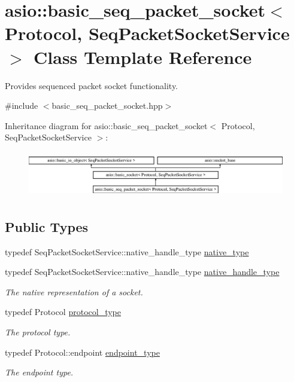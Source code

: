 \hypertarget{classasio_1_1basic__seq__packet__socket}{}\section{asio\+:\+:basic\+\_\+seq\+\_\+packet\+\_\+socket$<$ Protocol, Seq\+Packet\+Socket\+Service $>$ Class Template Reference}
\label{classasio_1_1basic__seq__packet__socket}


Provides sequenced packet socket functionality.  




{\ttfamily \#include $<$basic\+\_\+seq\+\_\+packet\+\_\+socket.\+hpp$>$}

Inheritance diagram for asio\+:\+:basic\+\_\+seq\+\_\+packet\+\_\+socket$<$ Protocol, Seq\+Packet\+Socket\+Service $>$\+:\begin{figure}[H]
\begin{center}
\leavevmode
\includegraphics[height=2.033898cm]{classasio_1_1basic__seq__packet__socket}
\end{center}
\end{figure}
\subsection*{Public Types}
\begin{DoxyCompactItemize}
\item 
typedef Seq\+Packet\+Socket\+Service\+::native\+\_\+handle\+\_\+type \hyperlink{classasio_1_1basic__seq__packet__socket_ad1bba59e6063a95b9449d847dec117db}{native\+\_\+type}
\item 
typedef Seq\+Packet\+Socket\+Service\+::native\+\_\+handle\+\_\+type \hyperlink{classasio_1_1basic__seq__packet__socket_aab4f35462c8d5eecf380d50336984ccd}{native\+\_\+handle\+\_\+type}
\begin{DoxyCompactList}\small\item\em The native representation of a socket. \end{DoxyCompactList}\item 
typedef Protocol \hyperlink{classasio_1_1basic__seq__packet__socket_a683a8578f6465370482fd9f3b51ac0ea}{protocol\+\_\+type}
\begin{DoxyCompactList}\small\item\em The protocol type. \end{DoxyCompactList}\item 
typedef Protocol\+::endpoint \hyperlink{classasio_1_1basic__seq__packet__socket_ad5f8549d940cf2c9325b02398910e98f}{endpoint\+\_\+type}
\begin{DoxyCompactList}\small\item\em The endpoint type. \end{DoxyCompactList}\end{DoxyCompactItemize}
